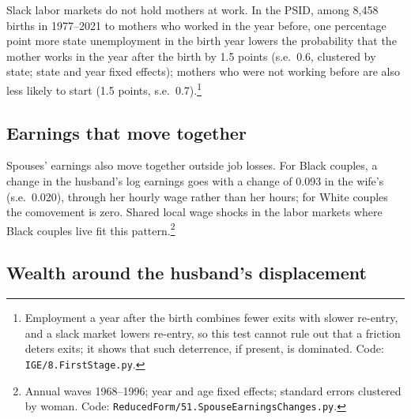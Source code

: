Slack labor markets do not hold mothers at work. In the PSID, among 8,458 births in 1977--2021 to mothers who worked in
the year before, one percentage point more state unemployment in the birth year lowers the probability that the mother
works in the year after the birth by 1.5 points (s.e.\ 0.6, clustered by state; state and year fixed effects); mothers
who were not working before are also less likely to start (1.5 points, s.e.\ 0.7).\footnote{Employment a year after the
birth combines fewer exits with slower re-entry, and a slack market lowers re-entry, so this test cannot rule out that
a friction deters exits; it shows that such deterrence, if present, is dominated. Code: \texttt{IGE/8.FirstStage.py}.}

\subsection{Earnings that move together}

Spouses' earnings also move together outside job losses. For Black couples, a change in the husband's log earnings goes
with a change of 0.093 in the wife's (s.e.\ 0.020), through her hourly wage rather than her hours; for White couples the
comovement is zero. Shared local wage shocks in the labor markets where Black couples live fit this pattern.\footnote{Annual
waves 1968--1996; year and age fixed effects; standard errors clustered by woman. Code:
\texttt{ReducedForm/51.SpouseEarningsChanges.py}.}

\subsection{Wealth around the husband's displacement}

